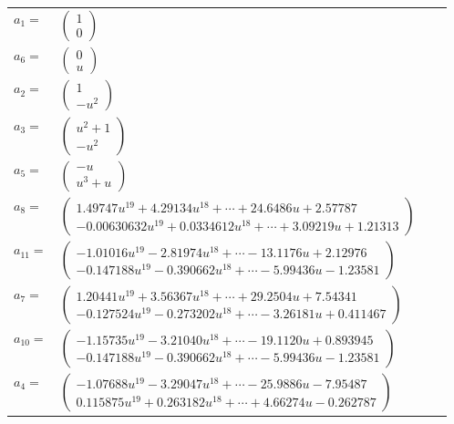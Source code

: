 \documentclass[1p]{elsarticle_modified}
\theoremstyle{definition}
\begin{document}
\begin{tabular}{m{7pt} m{180pt} m{7pt} m{180pt} }
\flushright $a_{1}=$&$\begin{pmatrix}1\\0\end{pmatrix}$ \\
\flushright $a_{6}=$&$\begin{pmatrix}0\\u\end{pmatrix}$ \\
\flushright $a_{2}=$&$\begin{pmatrix}1\\- u^2\end{pmatrix}$ \\
\flushright $a_{3}=$&$\begin{pmatrix}u^2+1\\- u^2\end{pmatrix}$ \\
\flushright $a_{5}=$&$\begin{pmatrix}- u\\u^3+u\end{pmatrix}$ \\
\flushright $a_{8}=$&$\begin{pmatrix}1.49747 u^{19}+4.29134 u^{18}+\cdots+24.6486 u+2.57787\\-0.00630632 u^{19}+0.0334612 u^{18}+\cdots+3.09219 u+1.21313\end{pmatrix}$ \\
\flushright $a_{11}=$&$\begin{pmatrix}-1.01016 u^{19}-2.81974 u^{18}+\cdots-13.1176 u+2.12976\\-0.147188 u^{19}-0.390662 u^{18}+\cdots-5.99436 u-1.23581\end{pmatrix}$ \\
\flushright $a_{7}=$&$\begin{pmatrix}1.20441 u^{19}+3.56367 u^{18}+\cdots+29.2504 u+7.54341\\-0.127524 u^{19}-0.273202 u^{18}+\cdots-3.26181 u+0.411467\end{pmatrix}$ \\
\flushright $a_{10}=$&$\begin{pmatrix}-1.15735 u^{19}-3.21040 u^{18}+\cdots-19.1120 u+0.893945\\-0.147188 u^{19}-0.390662 u^{18}+\cdots-5.99436 u-1.23581\end{pmatrix}$ \\
\flushright $a_{4}=$&$\begin{pmatrix}-1.07688 u^{19}-3.29047 u^{18}+\cdots-25.9886 u-7.95487\\0.115875 u^{19}+0.263182 u^{18}+\cdots+4.66274 u-0.262787\end{pmatrix}$ \\

\end{tabular}
\end{document}
